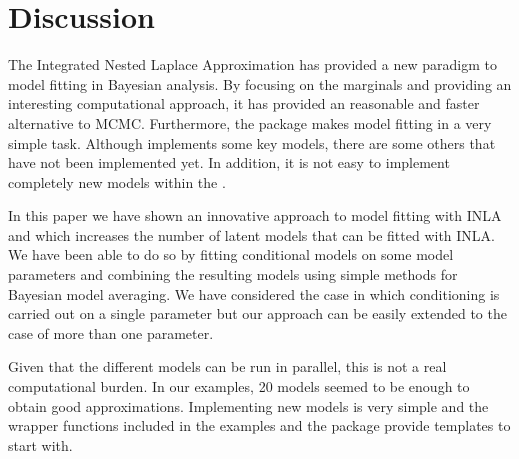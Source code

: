 \documentclass[article]{jss}
\begin{document}

%
%



\section{Discussion} \label{sec:disc}

The Integrated Nested Laplace Approximation has provided a new paradigm to
model fitting in Bayesian analysis. By focusing on the marginals and providing
an interesting computational approach, it has provided an reasonable and faster
alternative to MCMC. Furthermore, the  package makes model fitting
in  a very simple task.  Although  implements some key
models, there are some others that have not been implemented yet.
In addition, it is not easy to implement completely new models within the
.

In this paper we have shown an innovative approach to model fitting with INLA
and  which increases the number of latent models that can be fitted
with INLA. We have been able to do so by fitting conditional models on some
model parameters and combining the resulting models using simple methods for
Bayesian model averaging. We have considered the case in which conditioning is
carried out on a single parameter but our approach can be easily extended to the
case of more than one parameter.

Given that the different models can be run in parallel, this is not a real
computational burden. In our examples, 20 models seemed to be enough to obtain
good approximations. Implementing new models is very simple and the wrapper
functions included in the examples and the  package provide
templates to start with.
\end{document}
